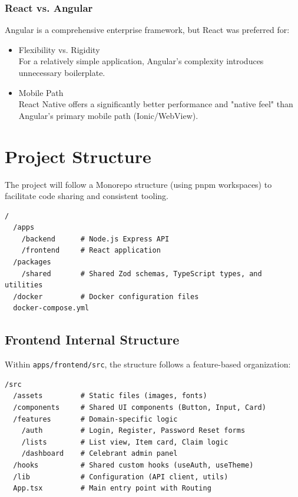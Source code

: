 \subsubsection{React vs. Angular}
Angular is a comprehensive enterprise framework, but React was preferred for:
\begin{itemize}
    \item Flexibility vs. Rigidity \\
        For a relatively simple application, Angular's complexity introduces unnecessary boilerplate.
    \item Mobile Path \\
        React Native offers a significantly better performance and "native feel" than Angular's primary mobile path (Ionic/WebView).
\end{itemize}

\section{Project Structure}
The project will follow a Monorepo structure (using pnpm workspaces) to facilitate code sharing and consistent tooling.

\begin{verbatim}
/
  /apps
    /backend      # Node.js Express API
    /frontend     # React application
  /packages
    /shared       # Shared Zod schemas, TypeScript types, and utilities
  /docker         # Docker configuration files
  docker-compose.yml
\end{verbatim}

\subsection{Frontend Internal Structure}
Within \texttt{apps/frontend/src}, the structure follows a feature-based organization:
\begin{verbatim}
/src
  /assets         # Static files (images, fonts)
  /components     # Shared UI components (Button, Input, Card)
  /features       # Domain-specific logic
    /auth         # Login, Register, Password Reset forms
    /lists        # List view, Item card, Claim logic
    /dashboard    # Celebrant admin panel
  /hooks          # Shared custom hooks (useAuth, useTheme)
  /lib            # Configuration (API client, utils)
  App.tsx         # Main entry point with Routing
\end{verbatim}

